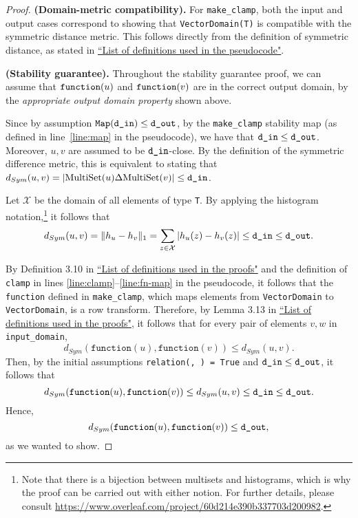 \documentclass{article}
\begin{document}
\begin{proof}
\smallskip
\textbf{(Domain-metric compatibility).} For \texttt{make\_clamp}, both the input and output cases correspond to showing that \texttt{VectorDomain(T)} is compatible with the symmetric distance metric. This follows directly from the definition of symmetric distance, as stated in \href{https://www.overleaf.com/project/60d215bf90b337ac02200a99}{``List of definitions used in the pseudocode"}.

\smallskip
\textbf{(Stability guarantee).} Throughout the stability guarantee proof, we can assume that $\texttt{function}(u)$ and $\texttt{function}(v)$ are in the correct output domain, by the \textit{appropriate output domain property} shown above. 

Since by assumption $\texttt{Map}(\texttt{d\_in}) \leq \texttt{d\_out}$, by the \texttt{make\_clamp} stability map (as defined in line~\ref{line:map} in the pseudocode), we have that $\texttt{d\_in} \leq \texttt{d\_out}$. 
Moreover, $u, v$ are assumed to be $\texttt{d\_in}$-close. By the definition of the symmetric difference metric, this is equivalent to stating that $d_{Sym}(u, v) = |\mathrm{MultiSet}(u) \Delta \mathrm{MultiSet}(v)| \leq \texttt{d\_in}$.

Let $\mathcal{X}$ be the domain of all elements of type \texttt{T}. By applying the histogram notation,\footnote{Note that there is a bijection between multisets and histograms, which is why the proof can be carried out with either notion. For further details, please consult \url{https://www.overleaf.com/project/60d214e390b337703d200982}.}  it follows that
\[
d_{Sym}(u, v) = \lVert h_{u} - h_{v}\rVert_1 = \sum_{z \in \mathcal{X}} |h_u(z) - h_v(z)| \leq \texttt{d\_in} \leq \texttt{d\_out}.
\]

By Definition 3.10 in \href{https://www.overleaf.com/project/60d214e390b337703d200982}{``List of definitions used in the proofs"} and the definition of \texttt{clamp} in lines \ref{line:clamp}--\ref{line:fn-map} in the pseudocode, it follows that the \texttt{function} defined in \texttt{make\_clamp}, which maps elements from \texttt{VectorDomain} to \texttt{VectorDomain}, is a row transform. Therefore, by Lemma 3.13 in \href{https://www.overleaf.com/project/60d214e390b337703d200982}{``List of definitions used in the proofs"}, it follows that for every pair of elements $v, w$ in \texttt{input\_domain},
\[
    d_{Sym}(\texttt{function}(u), \texttt{function}(v)) \leq d_{Sym}(u, v).
\]
Then, by the initial assumptions \texttt{relation(\din, \dout) = True} and $\texttt{d\_in} \leq \texttt{d\_out}$, it follows that
\[
    d_{Sym}(\texttt{function}(u), \texttt{function}(v)) \leq d_{Sym}(u, v) \leq \texttt{d\_in} \leq \texttt{d\_out}.
\]
Hence,
\[
    d_{Sym}(\texttt{function}(u), \texttt{function}(v)) \leq \texttt{d\_out},
\]
as we wanted to show.
\end{proof}
\end{document}
